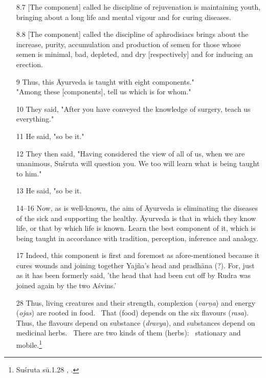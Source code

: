 \documentclass[12pt]{article}
\newcommand{\saneng}[2]{#2 (\emph{#1})}
\begin{document}
\begin{itemize}
        \item[8.7] [The component] called he discipline of rejuvenation is maintaining youth, bringing about a long life and mental vigour and for curing diseases.
        
        
        \item[8.8] [The component] called the discipline of aphrodisiacs brings about the increase, purity, accumulation and  production of semen for those whose semen is minimal, bad, depleted, and dry [respectively] and for inducing an erection.
        
        \item[9] Thus, this Āyurveda is taught with eight components."\\ 
        
        "Among these [components], tell us which is for whom."
        
        \item[10] They said, "After you have conveyed the knowledge of surgery, teach us everything."
        
        \item[11] He said, "so be it."
        
        \item[12] They then said, "Having considered the view of all of us, when we are unanimous, Suśruta will question you. We too will learn what is being taught to him."
        
        \item[13] He said, "so be it.
        
        \item[14–16] Now, as is well-known, the aim of Āyurveda is eliminating the diseases of the sick and supporting the healthy.  Āyurveda is that in which they know life, or that by which life is known. Learn the best component of it, which is being taught in accordance with tradition, perception, inference and analogy.
        
        \item[17] Indeed, this component is first and foremost as afore-mentioned because it cures wounds and joining together Yajña's head and pradhāna (?). For, just as it has been formerly said,  'the head that had been cut off by Rudra was joined again by the two Aśvins.'
    
    
    

  
    
    
    
    
    \item [28] Thus, living creatures and their strength,
\saneng{varṇa}{complexion} and \saneng{ojas}{energy} are rooted in food.  That
(food) depends on the six \saneng{rasa}{flavours}. Thus, the flavours depend
on \saneng{dravya}{substance}, and substances depend on medicinal herbs. 
There are two kinds of them (herbs):  stationary and mobile.\footnote{Suśruta
sū.1.28 \cite[I, 21]{shar-susr}, \cite[7]{susr-trikamji2004}.}
\end{itemize}
\end{document}
